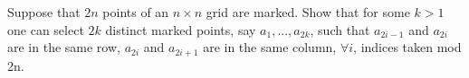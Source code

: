Suppose that $2n$ points of an $n\times n$ grid are marked. Show that for some $k > 1$ one can select $2k$ distinct marked points, say $a_1,...,a_{2k}$, such that $a_{2i-1}$ and $a_{2i}$ are in the same row, $a_{2i}$ and $a_{2i+1}$ are in the same column, $\forall i$, indices taken mod 2n.